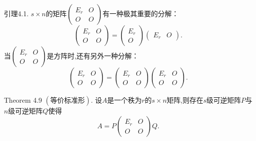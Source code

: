 \documentclass{article}
\begin{document}
\vspace{1ex}
{\heiti 引理4.1.} $s \times n$的矩阵$\left(\begin{array}{cc}
            E_r & O \\
            O   & O
        \end{array}\right)$有一种极其重要的分解：
\begin{equation*}
    \left(
    \begin{array}{cc}
        E_r & O \\
        O   & O
    \end{array}
    \right)
    =
    \left(
    \begin{array}{c}
        E_r \\
        O
    \end{array}
    \right)
    \left(
    \begin{array}{cc}
        E_r & O
    \end{array}
    \right).
\end{equation*}
当$\left(
    \begin{array}{cc}
            E_r & O \\
            O   & O
        \end{array}
    \right)$是方阵时,还有另外一种分解：
\begin{equation*}
    \left(
    \begin{array}{cc}
        E_r & O \\
        O   & O
    \end{array}
    \right)
    =
    \left(
    \begin{array}{cc}
        E_r & O \\
        O   & O
    \end{array}
    \right)
    \left(
    \begin{array}{cc}
        E_r & O \\
        O   & O
    \end{array}
    \right).
\end{equation*}

{\heiti Theorem 4.9} $\left(\text{等价标准形}\right)$. {\kaishu 设$A$是一个秩为$r$的$s \times n$矩阵,则存在$s$级可逆矩阵$P$与$n$级可逆矩阵$Q$使得}
\begin{equation*}
    A = P \left(
    \begin{array}{cc}
        E_r & O \\
        O   & O
    \end{array}
    \right)Q.
\end{equation*}
\end{document}
